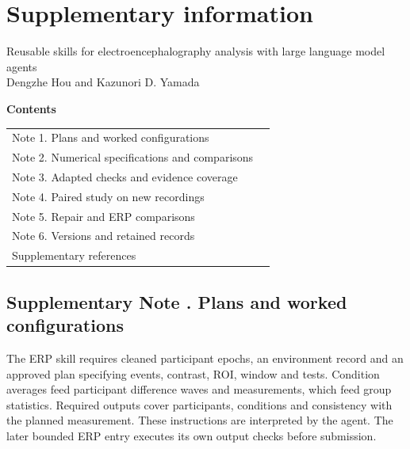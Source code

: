 
\clearpage
\appendix
\setcounter{page}{1}
\renewcommand{\thepage}{S\arabic{page}}
\setcounter{figure}{0}
\renewcommand{\thefigure}{S\arabic{figure}}
\renewcommand{\theHfigure}{S\arabic{figure}}
\section*{Supplementary information}
\begin{center}
\large Reusable skills for electroencephalography analysis with large language model agents\\[4pt]
\normalsize Dengzhe Hou and Kazunori D. Yamada
\end{center}
\makeatletter
\setlength{\@fptop}{0pt}
\makeatother
\renewcommand{\topfraction}{0.95}
\renewcommand{\textfraction}{0.05}
\renewcommand{\thetable}{S\arabic{table}}
\setcounter{table}{0}
\noindent\textbf{Contents}\par\smallskip
\begin{tabular}{@{}p{13.0cm}r@{}}
Note 1. Plans and worked configurations & \pageref{si:skills}\\
Note 2. Numerical specifications and comparisons & \pageref{si:numerical}\\
Note 3. Adapted checks and evidence coverage & \pageref{si:coverage}\\
Note 4. Paired study on new recordings & \pageref{si:paired-validation}\\
Note 5. Repair and ERP comparisons & \pageref{si:repair-validation}\\
Note 6. Versions and retained records & \pageref{si:sources}\\
Supplementary references & \pageref{si:references}\\
\end{tabular}

\subsection*{Supplementary Note \thesuppnote. Plans and worked configurations}
\label{si:skills}
\label{si:recorded}
\label{si:workflows}
\label{si:pilots}

The ERP skill requires cleaned participant epochs, an environment record and an approved plan specifying events, contrast, ROI, window and tests. Condition averages feed participant difference waves and measurements, which feed group statistics. Required outputs cover participants, conditions and consistency with the planned measurement. These instructions are interpreted by the agent. The later bounded ERP entry executes its own output checks before submission.

